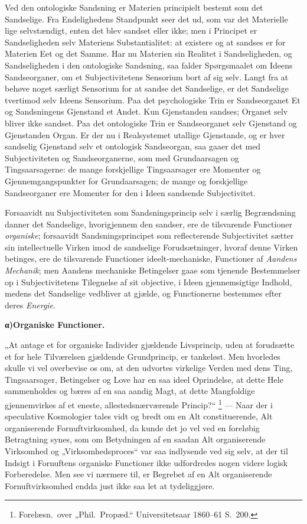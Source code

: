 \documentclass[12pt]{book}
\newcommand{\opage}[1]{\marginnote{\footnotesize\textit{[#1]}}}
\begin{document}
Ved den ontologiske Sandsning er Materien principielt bestemt som det Sandselige. Fra
Endelighedens Standpunkt seer det ud, som var det Materielle lige selvstændigt, enten det blev
sandset eller ikke; men i Principet er Sandseligheden selv Materiens Substantialitet: at
existere og at sandses er for Materien Eet og det Samme. Har nu Materien sin Realitet i
Sandseligheden, og Sandseligheden i den ontologiske
\opage{394} Sandsning, saa falder Spørgsmaalet om Ideens Sandseorganer, om et Subjectivitetens Sensorium
bort af sig selv. Langt fra at behøve noget særligt Sensorium for at sandse det Sandselige, er
det Sandselige tvertimod selv Ideens Sensorium. Paa det psychologiske Trin er Sandseorganet Et
og Sandsningens Gjenstand et Andet. Kun Gjenstanden sandses; Organet selv bliver ikke sandset.
Paa det ontologiske Trin er Sandseorganet selv Gjenstand og Gjenstanden Organ. Er der nu i
Realsystemet utallige Gjenstande, og er hver sandselig Gjenstand selv et ontologisk Sandseorgan,
saa gaaer det med Subjectiviteten og Sandseorganerne, som med Grundaarsagen og Tingsaarsagerne:
de mange forskjellige Tingsaarsager ere Momenter og Gjennemgangspunkter for Grundaarsagen; de
mange og forskjellige Sandseorganer ere Momenter for den i Ideen sandsende Subjectivitet.

Forsaavidt nu Subjectiviteten som Sandsningsprincip selv i særlig Begrændsning danner det
Sandselige, hvorigjennem den sandser, ere de tilsvarende Functioner \emph{organiske}; forsaavidt
Sandsningsprincipet som reflecterende Subjectivitet sætter sin intellectuelle Virken imod de
sandselige Forudsætninger, hvoraf denne Virken betinges, ere de tilsvarende Functioner
ideelt-mechaniske, Functioner af \emph{Aandens Mechanik}; men Aandens mechaniske Betingelser
gaae som tjenende Bestemmelser op i Subjectivitetens Tilegnelse af sit objective, i Ideen
gjennemsigtige Indhold, medens det Sandselige vedbliver at gjælde, og Functionerne bestemmes
efter deres \emph{Energie}.

\begin{center}{\bfseries α)\quad Organiske Functioner.}\end{center}

„At antage et for organiske Individer gjældende Livsprincip, uden at forudsætte et for hele
Tilværelsen gjældende Grundprincip, er tankeløst. Men hvorledes skulle vi vel overbevise os om,
at den udvortes virkelige Verden med dens Ting, Tingsaarsager, Betingelser og Love har en saa
ideel Oprindelse,
\opage{395} at dette Hele sammenholdes og bæres af en saa aandig Magt, at dette Mangfoldige gjennemvirkes af
et eneste, allestedsnærværende Princip?“%
\footnote{Forelæsn.\ over „Phil.\ Propæd.“ Universitetsaar 1860--61 S.~200.}
--- Naar der i speculative Kosmologier tales vidt og bredt om en Alt constituerende, Alt
organiserende Fornuftvirksomhed, da kunde det jo vel ved en foreløbig Betragtning synes, som om
Betydningen af en saadan Alt organiserende Virksomhed og „Virksomhedsproces“ var saa indlysende
ved sig selv, at der til Indsigt i Fornuftens organiske Functioner ikke udfordredes nogen videre
logisk Forberedelse. Men see vi nærmere til, er Begrebet af en Alt organiserende
Fornuftvirksomhed endda just ikke saa let at tydeliggjøre.
\end{document}
